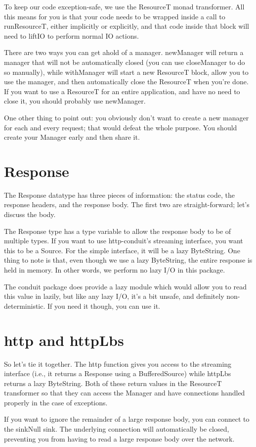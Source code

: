 To keep our code exception-safe, we use the ResourceT monad
transformer. All this means for you is that your code needs to be
wrapped inside a call to runResourceT, either implicitly or
explicitly, and that code inside that block will need to liftIO to
perform normal IO actions.

There are two ways you can get ahold of a manager. newManager will
return a manager that will not be automatically closed (you can use
closeManager to do so manually), while withManager will start a new
ResourceT block, allow you to use the manager, and then automatically
close the ResourceT when you're done. If you want to use a ResourceT
for an entire application, and have no need to close it, you should
probably use newManager.

One other thing to point out: you obviously don't want to create a new
manager for each and every request; that would defeat the whole
purpose. You should create your Manager early and then share it.

\section{Response}

The Response datatype has three pieces of information: the status
code, the response headers, and the response body. The first two are
straight-forward; let's discuss the body.

The Response type has a type variable to allow the response body to be
of multiple types. If you want to use http-conduit's streaming
interface, you want this to be a Source. For the simple interface, it
will be a lazy ByteString. One thing to note is that, even though we
use a lazy ByteString, the entire response is held in memory. In other
words, we perform no lazy I/O in this package.

The conduit package does provide a lazy module which would allow you
to read this value in lazily, but like any lazy I/O, it's a bit
unsafe, and definitely non-deterministic. If you need it though, you
can use it.

\section{http and httpLbs}

So let's tie it together. The http function gives you access to the
streaming interface (i.e., it returns a Response using a
BufferedSource) while httpLbs returns a lazy ByteString. Both of these
return values in the ResourceT transformer so that they can access the
Manager and have connections handled properly in the case of
exceptions.

If you want to ignore the remainder of a large response body, you can
connect to the sinkNull sink. The underlying connection will
automatically be closed, preventing you from having to read a large
response body over the network.
